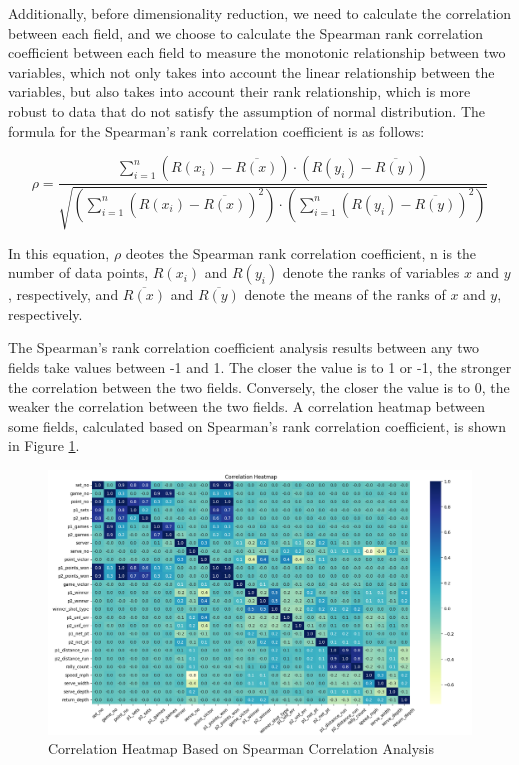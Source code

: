 Additionally, before dimensionality reduction, we need to calculate the correlation between each field, and we choose to calculate the Spearman rank correlation coefficient between each field to measure the monotonic relationship between two variables, which not only takes into account the linear relationship between the variables, but also takes into account their rank relationship, which is more robust to data that do not satisfy the assumption of normal distribution. The formula for the Spearman's rank correlation coefficient is as follows:

\begin{equation}
\rho=\frac{\sum_{i=1}^n\left(R(x_i)-\overline{R(x)}\right )\cdot \left(R(y_i)-\overline{R(y)}\right)}{\sqrt{\left(\sum_{i=1}^n\left(R(x_i)-\overline{R(x)}\right)^2\right)\cdot\left(\sum_{i=1}^n\left(R(y_i)-\overline{R(y)}\right)^2\right)}}\end{equation}

In this equation, $\rho$ deotes the Spearman rank correlation coefficient, n is the number of data points, $R(x_i)$ and $R(y_i)$ denote the ranks of variables $x$ and $y$, respectively, and $\overline{R(x)}$ and $\overline{R(y)}$ denote the means of the ranks of $x$ and $y$, respectively.

The Spearman’s rank correlation coefficient analysis results between any two fields take values between -1 and 1. The closer the value is to 1 or -1, the stronger the correlation between the two fields. Conversely, the closer the value is to 0, the weaker the correlation between the two fields. A correlation heatmap between some fields, calculated based on Spearman’s rank correlation coefficient, is shown in Figure \ref{fig:correlation_heatmap }.



\begin{figure}[h]
    \centering
    \includegraphics[width=1.05\textwidth]{figure/correlation heatmap.png}
    \caption{Correlation Heatmap Based on Spearman Correlation Analysis
    \textnormal{}}
    \label{fig:correlation_heatmap }
\end{figure}

